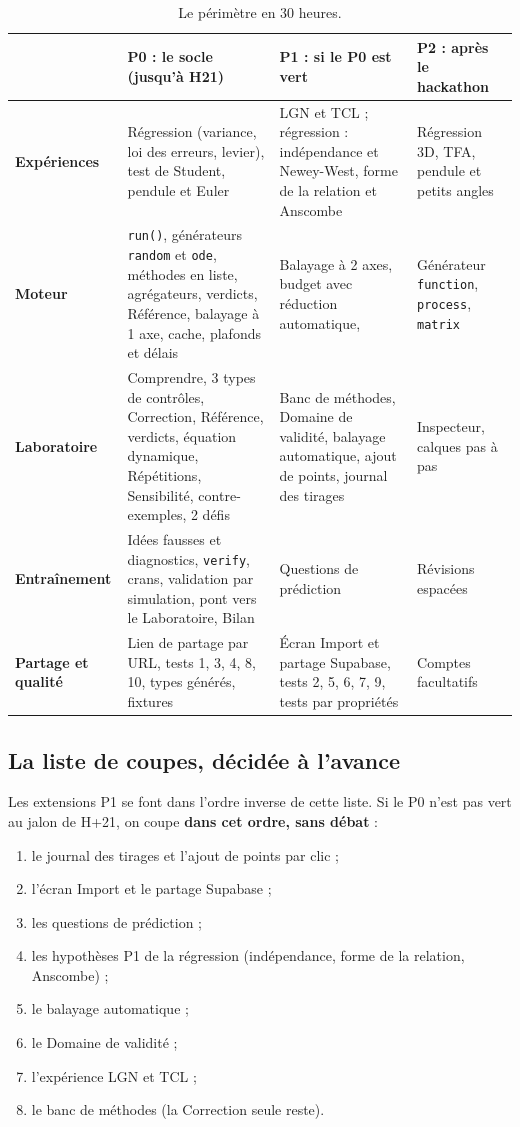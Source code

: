 \documentclass[11pt,a4paper]{article}
\newcommand{\pzero}{\colorbox{ctCorrection!18}{\footnotesize\textbf{P0}}}
\newcommand{\pone}{\colorbox{ctMethod!18}{\footnotesize\textbf{P1}}}
\newcommand{\ptwo}{\colorbox{ctBaseline!18}{\footnotesize\textbf{P2}}}
\begin{document}
\begin{table}[H]
  \centering
  \small
  \begin{tabularx}{\textwidth}{@{}L{2.4cm} Y Y Y@{}}
    \toprule
    & \textbf{\pzero{} : le socle (jusqu'à H21)} & \textbf{\pone{} : si le P0 est vert} & \textbf{\ptwo{} : après le hackathon} \\
    \midrule
    \textbf{Expériences} & Régression (variance, loi des erreurs, levier), test de Student, pendule et Euler & LGN et TCL ; régression : indépendance et Newey-West, forme de la relation et Anscombe & Régression 3D, TFA, pendule et petits angles \\
    \midrule
    \textbf{Moteur} & \texttt{run()}, générateurs \texttt{random} et \texttt{ode}, méthodes en liste, agrégateurs, verdicts, Référence, balayage à 1 axe, cache, plafonds et délais & Balayage à 2 axes, budget avec réduction automatique,  & Générateur \texttt{function}, \texttt{process}, \texttt{matrix} \\
    \midrule
    \textbf{Laboratoire} & Comprendre, 3 types de contrôles, Correction, Référence, verdicts, équation dynamique, Répétitions, Sensibilité, contre-exemples, 2 défis & Banc de méthodes, Domaine de validité, balayage automatique, ajout de points, journal des tirages & Inspecteur, calques pas à pas \\
    \midrule
    \textbf{Entraînement} & Idées fausses et diagnostics, \texttt{verify}, crans, validation par simulation, pont vers le Laboratoire, Bilan & Questions de prédiction & Révisions espacées \\
    \midrule
    \textbf{Partage et qualité} & Lien de partage par URL, tests 1, 3, 4, 8, 10, types générés, fixtures & Écran Import et partage Supabase, tests 2, 5, 6, 7, 9, tests par propriétés & Comptes facultatifs \\
    \bottomrule
  \end{tabularx}
  \caption{Le périmètre en 30 heures.}
\end{table}

\subsection{La liste de coupes, décidée à l'avance}
Les extensions P1 se font dans l'ordre inverse de cette liste. Si le P0 n'est pas vert au jalon de H+21, on coupe \textbf{dans cet ordre, sans débat} :
\begin{enumerate}[leftmargin=*, nosep]
  \item le journal des tirages et l'ajout de points par clic ;
  \item l'écran Import et le partage Supabase ;
  \item les questions de prédiction ;
  \item les hypothèses P1 de la régression (indépendance, forme de la relation, Anscombe) ;
  \item le balayage automatique ;
  \item le Domaine de validité ;
  \item l'expérience LGN et TCL ;
  \item le banc de méthodes (la Correction seule reste).
\end{enumerate}
\end{document}
